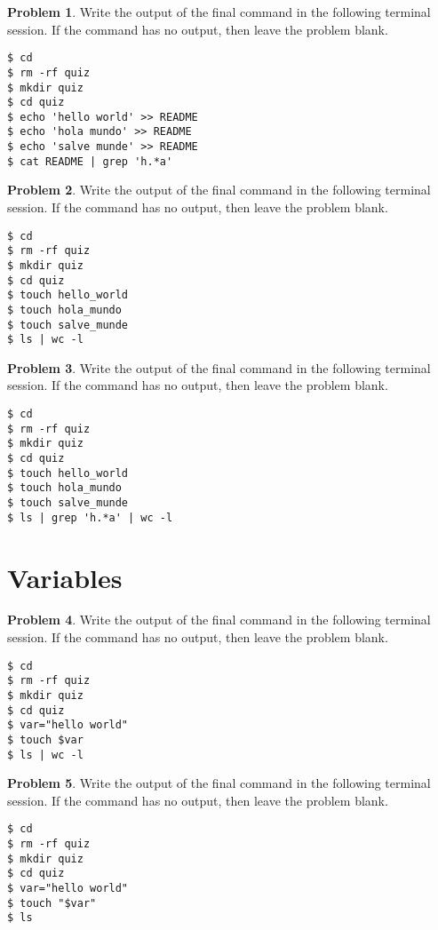 \documentclass[10pt]{article}
\theoremstyle{definition}
\newtheorem{problem}{Problem}
\begin{document}
\begin{problem}
    Write the output of the final command in the following terminal session.
    If the command has no output, then leave the problem blank.
\end{problem}
\begin{lstlisting}
$ cd
$ rm -rf quiz
$ mkdir quiz
$ cd quiz
$ echo 'hello world' >> README
$ echo 'hola mundo' >> README
$ echo 'salve munde' >> README
$ cat README | grep 'h.*a'
\end{lstlisting}
\vspace{0.4in}

\begin{problem}
    Write the output of the final command in the following terminal session.
    If the command has no output, then leave the problem blank.
\end{problem}
\begin{lstlisting}
$ cd
$ rm -rf quiz
$ mkdir quiz
$ cd quiz
$ touch hello_world
$ touch hola_mundo
$ touch salve_munde
$ ls | wc -l
\end{lstlisting}
\vspace{0.4in}

\begin{problem}
    Write the output of the final command in the following terminal session.
    If the command has no output, then leave the problem blank.
\end{problem}
\begin{lstlisting}
$ cd
$ rm -rf quiz
$ mkdir quiz
$ cd quiz
$ touch hello_world
$ touch hola_mundo
$ touch salve_munde
$ ls | grep 'h.*a' | wc -l
\end{lstlisting}
\vspace{0.4in}

\newpage
\section{Variables}

\begin{problem}
    Write the output of the final command in the following terminal session.
    If the command has no output, then leave the problem blank.
\end{problem}
\begin{lstlisting}
$ cd
$ rm -rf quiz
$ mkdir quiz
$ cd quiz
$ var="hello world"
$ touch $var
$ ls | wc -l
\end{lstlisting}
\vspace{0.4in}


\begin{problem}
    Write the output of the final command in the following terminal session.
    If the command has no output, then leave the problem blank.
\end{problem}
\begin{lstlisting}
$ cd
$ rm -rf quiz
$ mkdir quiz
$ cd quiz
$ var="hello world"
$ touch "$var"
$ ls
\end{lstlisting}
\vspace{0.4in}
\end{document}
